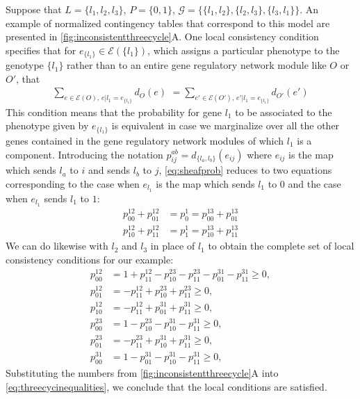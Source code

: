 Suppose that $L = \{l_1,l_2,l_3\}$, $P = \{0,1\}$, $\mathcal{G} = \{\{l_1,l_2\},\{l_2,l_3\},\{l_3,l_1\}\}$. An example of normalized contingency tables that correspond to this model are presented in \ref{fig:inconsistentthreecycle}A.
One local consistency condition specifies that for $e_{\{l_1\}} \in \mathcal{E}(\{l_1\})$, which assigns a particular phenotype to the genotype $\{l_1\}$ rather than to an entire gene regulatory network module like $O$ or $O'$, that
\begin{eqnarray}\label{eq:sheafprob}
\sum_{e \in \mathcal{E}(O),\, e|l_1=e_{\{l_1\}}} d_O(e) \,\, = \sum_{e' \in \mathcal{E}(O'),\, e'|l_1=e_{\{l_1\}}} d_{O'}(e')
\end{eqnarray}
This condition means that the probability for gene $l_1$ to be associated to the phenotype given by $e_{\{l_1\}}$ is equivalent in case we marginalize over all the other genes contained in the gene regulatory network modules of which $l_1$ is a component.  Introducing the notation $p^{ab}_{ij} = d_{\{l_a, l_b\}}(e_{ij})$ where $e_{ij}$ is the map which sends $l_a$ to $i$ and sends $l_b$ to $j$, \ref{eq:sheafprob} reduces to two equations corresponding to the case when $e_{l_1}$ is the map which sends $l_1$ to $0$ and the case when $e_{l_1}$ sends $l_1$ to $1$:
\begin{align*}
 p^{12}_{00} + p^{12}_{01} &= p^{1}_0 = p^{13}_{00} + p^{13}_{01} \\
 p^{12}_{10} + p^{12}_{11} &= p^{1}_1 = p^{13}_{10} + p^{13}_{11}
 \end{align*}
We can do likewise with $l_2$ and $l_3$ in place of $l_1$ to obtain the complete set of local consistency conditions for our example:
\begin{equation}
\begin{aligned}\label{eq:threecycinequalities}
p^{12}_{00} &= 1 + p^{12}_{11} - p^{23}_{10} - p^{23}_{11} - p^{31}_{01} - p^{31}_{11} \geq 0, \\
p^{12}_{01} &= -p^{12}_{11} + p^{23}_{10} + p^{23}_{11} \geq 0,\\
p^{12}_{10} &= -p^{12}_{11} + p^{31}_{01} + p^{31}_{11} \geq 0,\\
p^{23}_{00} &= 1-p^{23}_{10} - p^{31}_{10} - p^{31}_{11} \geq 0,\\
p^{23}_{01} &= -p^{23}_{11} + p^{31}_{10} + p^{31}_{11} \geq 0,\\
p^{31}_{00} &= 1-p^{31}_{01} - p^{31}_{10} - p^{31}_{11} \geq 0,
\end{aligned}
\end{equation}
Substituting the numbers from \ref{fig:inconsistentthreecycle}A into \ref{eq:threecycinequalities}, we conclude that the local conditions are satisfied.

